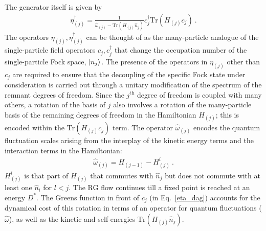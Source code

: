 \documentclass{iopart}
\begin{document}
The generator itself is given by ~\cite{anirbanurg1,anirbanurg2}
\begin{eqnarray}
	\label{eta_dag}
	\eta^\dagger_{(j)} = \frac{1}{\hat \omega_{(j)} - \mathrm{Tr}\left(H_{(j)} \hat n_{j}\right) } c^\dagger_{j} \mathrm{Tr}\left(H_{(j)}c_{j}\right)~.
\end{eqnarray}
The operators \(\eta_{(j)},\eta^\dagger_{(j)}\) can be thought of as the many-particle analogue of the single-particle field operators \(c_j,c^\dagger_j\) that change the occupation number of the single-particle Fock space, \(\ket{n_j}\). The presence of the operators in $\eta_{(j)}$ other than $c_j$ are required to ensure that the decoupling of the specific Fock state under consideration is carried out through a unitary modification of the spectrum of the remnant degrees of freedom. Since the \(j^\mathrm{th}\) degree of freedom is coupled with many others, a rotation of the basis of \(j\) also involves a rotation of the many-particle basis of the remaining degrees of freedom in the Hamiltonian \(H_{(j)}\); this is encoded within the \(\mathrm{Tr}\left(H_{(j)} c_j\right) \) term.
The operator \(\hat \omega_{(j)}\) encodes the quantum fluctuation scales arising from the interplay of the kinetic energy terms and the interaction terms in the Hamiltonian:
\begin{eqnarray}
	\hat \omega_{(j)} = H_{(j-1)} - H^i_{(j)}~.
\end{eqnarray}
\(H^i_{(j)}\) is that part of \(H_{(j)}\) that commutes with \(\hat n_j\) but does not commute with at least one \(\hat n_l\) for \(l < j\). The RG flow continues till a fixed point is reached at an energy \(D^*\). The Greens function in front of $c_j$ (in Eq.~\ref{eta_dag}) accounts for the dynamical cost of this rotation in terms of an operator for quantum fluctuations (\(\hat \omega\)), as well as the kinetic and self-energies \(\mathrm{Tr}\left( H_{(j)}\hat n_j \right) \).
\end{document}
